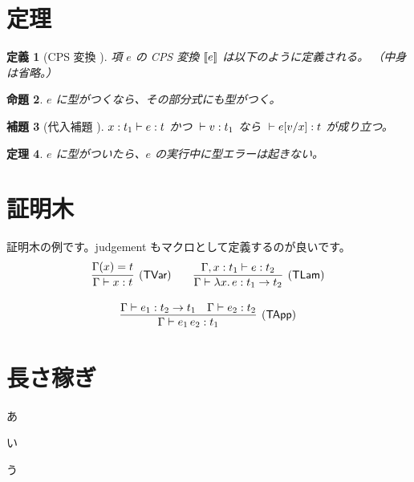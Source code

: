 \documentclass[twoside, twocolumn, a4paper]{jarticle}
\newtheorem{definition}{定義}
\newtheorem{proposition}[definition]{命題}
\newtheorem{lemma}[definition]{補題}
\newtheorem{theorem}[definition]{定理}
\begin{document}
\section{定理}\label{sec:theorem}
\begin{definition}[CPS 変換 \cite{Plotkin1975}]
\upshape %
項 $e$ の CPS 変換 $[\![{e]\!]}$ は以下のように定義される。
（中身は省略。）
\end{definition}

\begin{proposition}
$e$ に型がつくなら、その部分式にも型がつく。
\end{proposition}

\begin{lemma}[代入補題 \cite{WF1994}]
${x:t_1}\vdash{e}:{t}$ かつ ${}\vdash{v}:{t_1}$ なら
${}\vdash{e[v/x]}:{t}$ が成り立つ。
\end{lemma}

\begin{theorem}
$e$ に型がついたら、$e$ の実行中に型エラーは起きない。
\end{theorem}

\section{証明木}\label{sec:proof}
証明木の例です。judgement もマクロとして定義するのが良いです。
\[
\begin{array}{c}
\infer[(\textsf{TVar})]
      {\Judge{\Gamma}{x}{t}}
      {\Gamma(x)=t}
\qquad
\infer[(\textsf{TLam})]
      {\Judge{\Gamma}{\Lam{x}{e}}{\Arrow{t_1}{t_2}}}
      {\Judge{\Gamma,x:t_1}{e}{t_2}} \\
\ \\
\infer[(\textsf{TApp})]
      {\Judge{\Gamma}{\App{e_1}{e_2}}{t_1}}
      {\Judge{\Gamma}{e_1}{\Arrow{t_2}{t_1}}
      &\Judge{\Gamma}{e_2}{t_2}} \\
\end{array}
\]

\section{長さ稼ぎ}
あ

い

う
\end{document}
